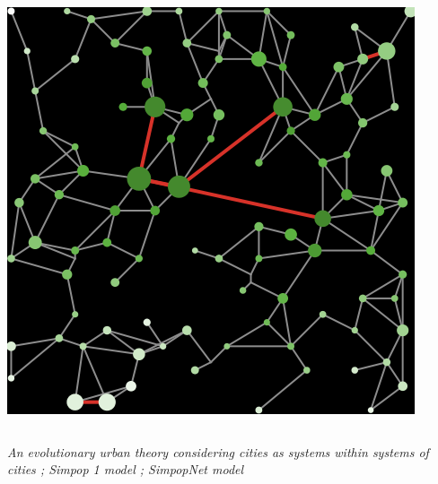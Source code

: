 {\begin{center}
\begin{columns}
\begin{column}{0.22\linewidth}
	\includegraphics[width=\textwidth]{figures/setup_synth_1_tick100.png}
	\end{column}
	\end{columns}
\end{center}

\footnotesize
\textit{An evolutionary urban theory considering cities as systems within systems of cities \cite{pumain2018evolutionary}; Simpop 1 model \cite{sanders1997simpop}; SimpopNet model \cite{schmitt2014modelisation}}


}


